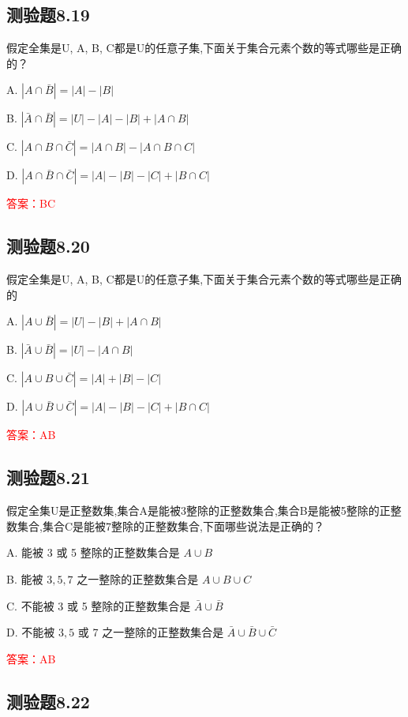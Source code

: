 \documentclass[UTF8, heading=true]{ctexart}
\begin{document}
\subsection{测验题8.19}

假定全集是U, A, B, C都是U的任意子集,下面关于集合元素个数的等式哪些是正确的？

A. $|A \cap \bar{B}|=|A|-|B|$

B. $|\bar{A} \cap \bar{B}|=|U|-|A|-|B|+|A \cap B|$

C. $|A \cap B \cap \bar{C}|=|A \cap B|-|A \cap B \cap C|$

D. $|A \cap \bar{B} \cap \bar{C}|=|A|-|B|-|C|+|B \cap C|$

\textcolor{red}{答案：BC}

\subsection{测验题8.20}

假定全集是U, A, B, C都是U的任意子集,下面关于集合元素个数的等式哪些是正确的

A. $|A \cup \bar{B}|=|U|-|B|+|A \cap B|$

B. $|\bar{A} \cup \bar{B}|=|U|-|A \cap B|$

C. $|A \cup B \cup \bar{C}|=|A|+|B|-|C|$

D. $|A \cup \bar{B} \cup \bar{C}|=|A|-|B|-|C|+|B \cap C|$

\textcolor{red}{答案：AB}

\subsection{测验题8.21}

假定全集U是正整数集,集合A是能被3整除的正整数集合,集合B是能被5整除的正整数集合,集合C是能被7整除的正整数集合,下面哪些说法是正确的？

A. 能被 3 或 5 整除的正整数集合是 $A \cup B$

B. 能被 $3,5,7$ 之一整除的正整数集合是 $A \cup B \cup C$

C. 不能被 3 或 5 整除的正整数集合是 $\bar{A} \cup \bar{B}$

D. 不能被 $3,5$ 或 7 之一整除的正整数集合是 $\bar{A} \cup \bar{B} \cup \bar{C}$

\textcolor{red}{答案：AB}

\subsection{测验题8.22}
\end{document}
